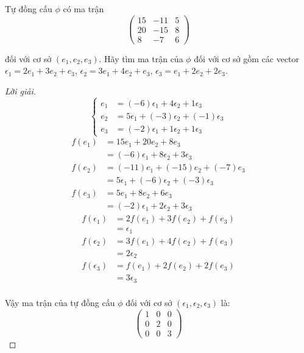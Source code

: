 \documentclass[class=nhvh-linear-algebra,crop=false]{standalone}
\begin{document}
\begin{exercise}
    Tự đồng cấu $\phi$ có ma trận
    \[
        \begin{pmatrix}
            15 & -11 & 5 \\
            20 & -15 & 8 \\
            8  & -7  & 6
        \end{pmatrix}
    \]
    \par đối với cơ sở $(e_{1}, e_{2}, e_{3})$. Hãy tìm ma trận của $\phi$ đối với cơ sở gồm các vector $\epsilon_{1} = 2e_{1} + 3e_{2} + e_{3}$, $\epsilon_{2} = 3e_{1} + 4e_{2} + e_{3}$, $\epsilon_{3} = e_{1} + 2e_{2} + 2e_{3}$.
\end{exercise}

\begin{proof}[Lời giải]
    \[
        \begin{cases}
            e_{1} & = (-6)\epsilon_{1} + 4\epsilon_{2} + 1\epsilon_{3}    \\
            e_{2} & = 5\epsilon_{1} + (-3)\epsilon_{2} + (-1)\epsilon_{3} \\
            e_{3} & = (-2)\epsilon_{1} + 1\epsilon_{2} + 1\epsilon_{3}
        \end{cases}
    \]
    \begin{align*}
        f(e_{1}) & = 15e_{1} + 20e_{2} + 8e_{3}                          \\
                 & = (-6)\epsilon_{1} + 8\epsilon_{2} + 3\epsilon_{3}    \\
        f(e_{2}) & = (-11)e_{1} + (-15)e_{2} + (-7)e_{3}                 \\
                 & = 5\epsilon_{1} + (-6)\epsilon_{2} + (-3)\epsilon_{3} \\
        f(e_{3}) & = 5e_{1} + 8e_{2} + 6e_{3}                            \\
                 & = (-2)\epsilon_{1} + 2\epsilon_{2} + 3\epsilon_{3}
    \end{align*}
    \begin{align*}
        f(\epsilon_{1}) & = 2f(e_{1}) + 3f(e_{2}) + f(e_{3}) \\
                        & = \epsilon_{1}                     \\
        f(\epsilon_{2}) & = 3f(e_{1}) + 4f(e_{2}) + f(e_{3}) \\
                        & = 2\epsilon_{2}                    \\
        f(\epsilon_{3}) & = f(e_{1}) + 2f(e_{2}) + 2f(e_{3}) \\
                        & = 3\epsilon_{3}                    \\
    \end{align*}
    \par Vậy ma trận của tự đồng cấu $\phi$ đối với cơ sở $(\epsilon_{1}, \epsilon_{2}, \epsilon_{3})$ là:
    \[
        \begin{pmatrix}
            1 & 0 & 0 \\
            0 & 2 & 0 \\
            0 & 0 & 3
        \end{pmatrix}
    \]
\end{proof}
\end{document}
